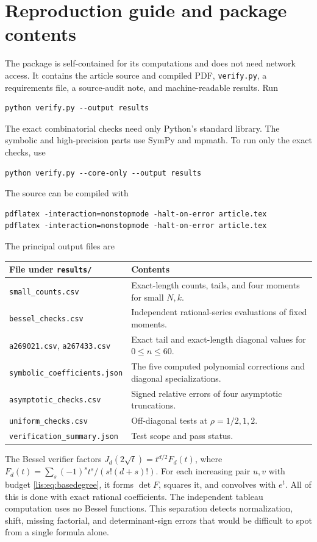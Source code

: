 \documentclass[11pt,letterpaper]{article}
\numberwithin{equation}{section}
\theoremstyle{definition}
\begin{document}
\appendix
\section{Reproduction guide and package contents}
The package is self-contained for its computations and does not need
network access. It contains the article source and compiled PDF,
\texttt{verify.py}, a requirements file, a source-audit note, and
machine-readable results. Run
\begin{lstlisting}
python verify.py --output results
\end{lstlisting}
The exact combinatorial checks need only Python's standard library.
The symbolic and high-precision parts use SymPy and mpmath. To run
only the exact checks, use
\begin{lstlisting}
python verify.py --core-only --output results
\end{lstlisting}
The source can be compiled with
\begin{lstlisting}
pdflatex -interaction=nonstopmode -halt-on-error article.tex
pdflatex -interaction=nonstopmode -halt-on-error article.tex
\end{lstlisting}

The principal output files are
\begin{center}
\begin{tabular}{@{}p{}p{}@{}}
\toprule
File under \texttt{results/} & Contents\\
\midrule
\texttt{small\_counts.csv} & Exact-length counts, tails, and four moments for small $N,k$.\\
\texttt{bessel\_checks.csv} & Independent rational-series evaluations of fixed moments.\\
\texttt{a269021.csv}, \texttt{a267433.csv} & Exact tail and exact-length diagonal values for $0\le n\le60$.\\
\texttt{symbolic\_coefficients.json} & The five computed polynomial corrections and diagonal specializations.\\
\texttt{asymptotic\_checks.csv} & Signed relative errors of four asymptotic truncations.\\
\texttt{uniform\_checks.csv} & Off-diagonal tests at $\rho=1/2,1,2$.\\
\texttt{verification\_summary.json} & Test scope and pass status.\\
\bottomrule
\end{tabular}
\end{center}

The Bessel verifier factors
$J_d(2\sqrt t)=t^{d/2}F_d(t)$, where
$F_d(t)=\sum_s(-1)^st^s/(s!(d+s)!)$. For each increasing pair $u,v$
with budget \eqref{lis:eq:basedegree}, it forms $\det F$, squares it,
and convolves with $e^t$. All of this is done with exact rational
coefficients. The independent tableau computation uses no Bessel
functions. This separation detects normalization, shift, missing
factorial, and determinant-sign errors that would be difficult to
spot from a single formula alone.
\end{document}
